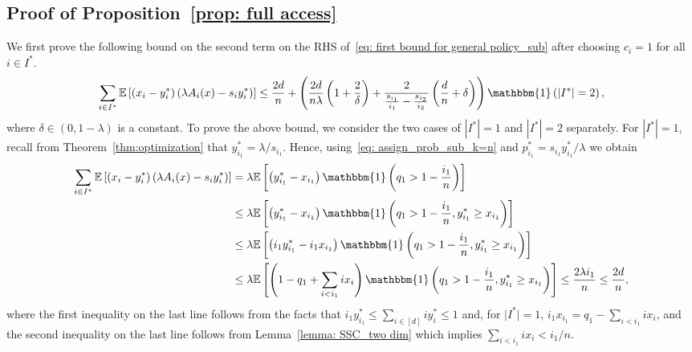 \documentclass[a4paper]{article}
\def\ind{\mathbbm{1}}
\theoremstyle{plain}
\theoremstyle{definition}
\theoremstyle{case}
\theoremstyle{remark}
\newcommand{\brac}[1]{\left(#1\right)}
\newcommand{\sbrac}[1]{\left[#1\right]}
\newcommand{\expect}[1]{\mathbb{E}\sbrac{#1}}
\newcommand{\abs}[1]{\lvert #1 \rvert}
\begin{document}



\subsection{Proof of Proposition~\ref{prop: full access}}

We first prove the following bound
on the second term on the RHS of~\eqref{eq: first bound for general policy_sub}
after choosing $c_i=1$ for all $i\in I^*$.
\begin{equation}\label{eq: three terms to bound}
   \sum_{i \in I^*} \expect{\brac{x_i - y_i^*} \brac{\lambda A_i(x) - s_i y_i^*}} 
   \leq 
   \frac{2d}{n} 
       +\brac{\frac{2d}{n\lambda}\brac{1+\frac{2}{\delta}} 
       +\frac{2}{\frac{s_{i_1}}{i_1}-\frac{s_{i_2}}{i_2}} \brac{\frac{d}{n}+ \delta}}\ind \brac{|I^*|=2},
  \end{equation}
%
where $\delta \in (0, 1- \lambda)$ is a constant. To prove the above bound, we consider the two cases of $|I^*|=1$ and $|I^*|=2$ separately. For $|I^*| = 1$, recall from Theorem~\ref{thm:optimization} that $y_{i_1}^* = \lambda / s_{i_1}$. Hence, using~\eqref{eq: assign_prob_sub_k=n} and $p_{i_1}^* = s_{i_1} y_{i_1}^* /\lambda$ we obtain
    \begin{align*} 
        \sum_{i \in I^*} \expect{ \brac{x_i - y_i^*} \brac{\lambda A_i(x) - s_i y_i^*}}  
        &=\lambda\expect{\brac{ y_{i_1}^*- x_{i_1} } \ind \brac{q_1 > 1-\frac{i_1}{n}}}\\
        &\leq \lambda \expect{\brac{ y_{i_1}^*- x_{i_1} } \ind \brac{q_1 > 1-\frac{i_1}{n}, y_{i_1}^*\geq x_{i_1}}}\\
        &\leq \lambda \expect{\brac{ i_1 y_{i_1}^*- i_1 x_{i_1} } \ind \brac{q_1 > 1-\frac{i_1}{n}, y_{i_1}^*\geq x_{i_1}}}\\
        &\leq \lambda \expect{\brac{ 1- q_1 + \sum_{i < i_1} ix_i} \ind \brac{q_1 > 1-\frac{i_1}{n}, y_{i_1}^*\geq x_{i_1}}} \leq \frac{2 \lambda i_1}{n}\leq \frac{2 d}{n},
    \end{align*}
%
%
where the first inequality on the last line follows from the facts that $i_1 y_{i_1}^* \leq \sum_{i \in [d]} i y_i^* \leq 1$ and, for $\abs{I^*}=1$, $i_1 x_{i_1}=q_1 - \sum_{ i < i_1} ix_i$, and the second inequality on the last line follows from
Lemma~\ref{lemma: SSC_two dim} which implies $\sum_{i < i_1} ix_i < i_1/n$.
    
\end{document}
